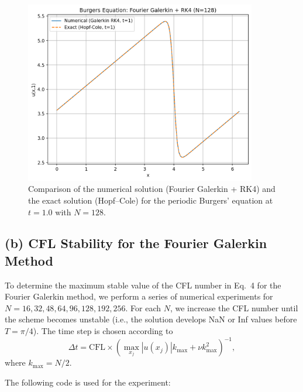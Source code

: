 \documentclass{article}
\begin{document}
\begin{figure}[htbp]
    \centering
    \includegraphics[width=0.9\textwidth]{figure/burgers_galerkin_solution.png}
    \caption{Comparison of the numerical solution (Fourier Galerkin + RK4) and the exact solution (Hopf--Cole) for the periodic Burgers' equation at $t=1.0$ with $N=128$.}
    \label{fig:burgers_galerkin_solution}
\end{figure}

\subsection*{(b) CFL Stability for the Fourier Galerkin Method}
To determine the maximum stable value of the CFL number in Eq.~4 for the Fourier Galerkin method, we perform a series of numerical experiments for $N = 16, 32, 48, 64, 96, 128, 192, 256$. For each $N$, we increase the CFL number until the scheme becomes unstable (i.e., the solution develops NaN or Inf values before $T=\pi/4$). The time step is chosen according to
\[
\Delta t = \text{CFL} \times \left( \max_{x_j} |u(x_j)| k_{\max} + \nu k_{\max}^2 \right)^{-1},
\]
where $k_{\max} = N/2$.

The following code is used for the experiment:
\end{document}
